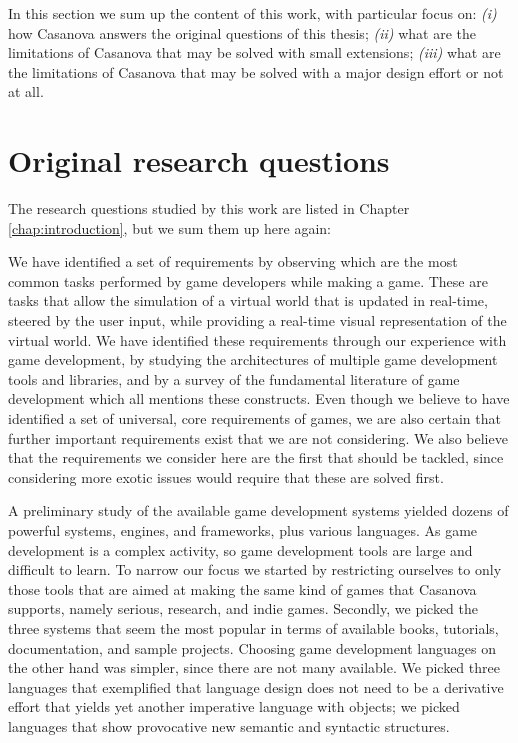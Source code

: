 In this section we sum up the content of this work, with particular focus on: \textit{(i)} how Casanova answers the original questions of this thesis; \textit{(ii)} what are the limitations of Casanova that may be solved with small extensions; \textit{(iii)} what are the limitations of Casanova that may be solved with a major design effort or not at all.

\section{Original research questions}
The research questions studied by this work are listed in Chapter \ref{chap:introduction}, but we sum them up here again:



We have identified a set of requirements by observing which are the most common tasks performed by game developers while making a game. These are tasks that allow the simulation of a virtual world that is updated in real-time, steered by the user input, while providing a real-time visual representation of the virtual world. We have identified these requirements through our experience with game development, by studying the architectures of multiple game development tools and libraries, and by a survey of the fundamental literature of game development which all mentions these constructs. Even though we believe to have identified a set of universal, core requirements of games, we are also certain that further important requirements exist that we are not considering. We also believe that the requirements we consider here are the first that should be tackled, since considering more exotic issues would require that these are solved first.

A preliminary study of the available game development systems yielded dozens of powerful systems, engines, and frameworks, plus various languages. As game development is a complex activity, so game development tools are large and difficult to learn. To narrow our focus we started by restricting ourselves to only those tools that are aimed at making the same kind of games that Casanova supports, namely serious, research, and indie games. Secondly, we picked the three systems that seem the most popular in terms of available books, tutorials, documentation, and sample projects.
Choosing game development languages on the other hand was simpler, since there are not many available. We picked three languages that exemplified that language design does not need to be a derivative effort that yields yet another imperative language with objects; we picked languages that show provocative new semantic and syntactic structures.

